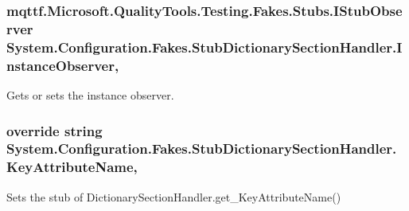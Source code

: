 \hypertarget{class_system_1_1_configuration_1_1_fakes_1_1_stub_dictionary_section_handler_a08e95477d2b783e4c26abf07631d270d}{
\subsubsection[{Instance\-Observer}]{\setlength{\rightskip}{0pt plus 5cm}mqttf.\-Microsoft.\-Quality\-Tools.\-Testing.\-Fakes.\-Stubs.\-I\-Stub\-Observer System.\-Configuration.\-Fakes.\-Stub\-Dictionary\-Section\-Handler.\-Instance\-Observer\hspace{0.3cm}{\ttfamily [get]}, {\ttfamily [set]}}}\label{class_system_1_1_configuration_1_1_fakes_1_1_stub_dictionary_section_handler_a08e95477d2b783e4c26abf07631d270d}


Gets or sets the instance observer.

\hypertarget{class_system_1_1_configuration_1_1_fakes_1_1_stub_dictionary_section_handler_a5a19e2772067e8ed1f0697edf2a97b9f}{
\subsubsection[{Key\-Attribute\-Name}]{\setlength{\rightskip}{0pt plus 5cm}override string System.\-Configuration.\-Fakes.\-Stub\-Dictionary\-Section\-Handler.\-Key\-Attribute\-Name\hspace{0.3cm}{\ttfamily [get]}, {\ttfamily [protected]}}}\label{class_system_1_1_configuration_1_1_fakes_1_1_stub_dictionary_section_handler_a5a19e2772067e8ed1f0697edf2a97b9f}


Sets the stub of Dictionary\-Section\-Handler.\-get\-\_\-\-Key\-Attribute\-Name()

